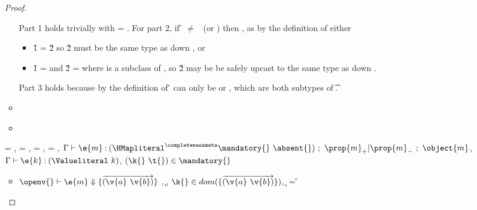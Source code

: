 \begin{lemma}
\begin{enumerate}
\begin{proof}
\begin{case}[T-IsA]
\begin{itemize}
\begin{subcase}[B-IsA]
  Part 1 holds trivially with \object{} = \emptyobject{}.
  For part 2, if \v{} $\not=$ \false\ (or \nil)
  then {}, as by the definition
  of \isaopsemliteral either 
  \begin{itemize}
    \item \v{1} = \v{2} so {\v{2}} must be the same type as down {}, or
    \item \v{1} =  and \v{2} =  where 
  is a subclass of , so {\v{2}} may be be safely upcast to the same type as down {}.
  \end{itemize}
  Part 3 holds because by the definition of \isaopsemliteral
  \v{} can only be \true or \false, which are both subtypes of
  \t{}.


      \end{subcase}
    \item[]
      \begin{subcase}[BE-IsA1]
      \end{subcase}
    \item[]
      \begin{subcase}[BE-IsA2]
      \end{subcase}
  \end{itemize}
\end{case}

\begin{case}[T-GetHMap]
  \e{} = { {}},
  \thenprop{\prop{}} = {\topprop{}},
  \elseprop{\prop{}} = {\topprop{}},
  \object{} = {
                          {}
                          {\x{}}},
  $\judgement {\propenv{}} {\hastype {\e{m}} {\HMapgeneric {\mandatory{}} {\absent{}}}}
           {\filterset {\thenprop {\prop{m}}} {\elseprop {\prop{m}}}}
           {\object{m}}$,
  $\judgementtwo {\propenv{}} {\hastype {\e{k}} {\Value {k}}}$,
             ${\inmandatory{\k{}}{\t{}}{\mandatory{}}}$


  \begin{itemize}
    \item[]
      \begin{subcase}[B-Get]
        $\opsem {\openv{}}
        {\e{m}} {\curlymap{\overrightarrow{({\v{a}}\ {\v{b}})}}}$
        ,
         \opsem {\openv{}}
                 {} {\k{}},
         $\keyinmap{\k{}}{\curlymap{\overrightarrow{({\v{a}}\ {\v{b}})}}}$,
          {\k{}} = {\v{}}


\end{subcase}
\end{itemize}
\end{case}
\end{proof}
\end{enumerate}
\end{lemma}
